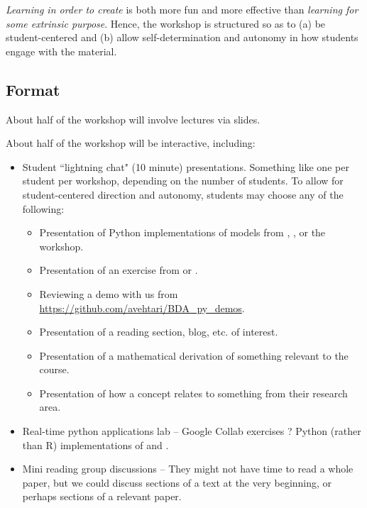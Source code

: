 \documentclass{article} %
\begin{document}
\textit{Learning in order to create} is both more fun and more effective than \textit{learning for some extrinsic purpose}.   Hence,  the workshop is structured so as to (a) be student-centered and (b) allow self-determination and autonomy in how students engage with the material. 

\subsection{Format}

About half of the workshop will involve lectures via slides.   

About half of the workshop will be interactive,  including:

\begin{itemize}
\item Student ``lightning chat" (10 minute) presentations.   Something like one per student per workshop,  depending on the number of students.    To allow for student-centered direction and autonomy,  students may choose any of the following:
	\begin{itemize}
	\item Presentation of Python implementations of models from \cite{hoff2009first} ,  \cite{ gelman2013bayesian},  or the workshop.
	\item Presentation of an exercise from \cite{gelman2013bayesian} or \cite{hoff2009first}.
	\item Reviewing a demo with us from \url{https://github.com/avehtari/BDA_py_demos}.
	\item Presentation of a reading section,  blog,  etc.  of interest.
	\item Presentation of a mathematical derivation of something relevant to the course.
	\item Presentation of how a concept relates to something from their research area.
	\end{itemize}

\item Real-time python applications lab -- Google Collab exercises ?  Python (rather than R) implementations of \cite{hoff2009first} and \cite{gelman2013bayesian}.
\item Mini reading group discussions  -- They might not have time to read a whole paper,  but we could discuss sections of a text at the very beginning, or perhaps sections of a relevant paper.
\end{itemize}
\end{document}
